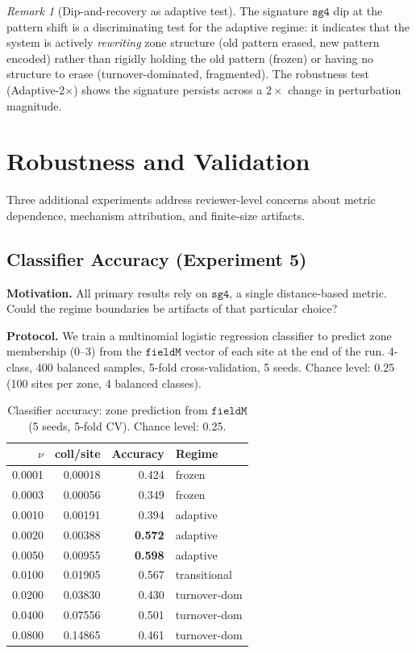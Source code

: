 \documentclass[11pt]{article}
\theoremstyle{remark}
\newtheorem{remark}[theorem]{Remark}
\begin{document}
\begin{remark}[Dip-and-recovery as adaptive test]
The signature $\mathtt{sg4}$ dip at the pattern shift is a discriminating test
for the adaptive regime: it indicates that the system is actively \emph{rewriting}
zone structure (old pattern erased, new pattern encoded) rather than rigidly
holding the old pattern (frozen) or having no structure to erase (turnover-dominated, fragmented).
The robustness test (Adaptive-2$\times$) shows the signature persists across a
$2\times$ change in perturbation magnitude.
\end{remark}

\section{Robustness and Validation}

Three additional experiments address reviewer-level concerns about metric
dependence, mechanism attribution, and finite-size artifacts.

\subsection{Classifier Accuracy (Experiment 5)}

\textbf{Motivation.} All primary results rely on $\mathtt{sg4}$, a single
distance-based metric. Could the regime boundaries be artifacts of that
particular choice?

\textbf{Protocol.} We train a multinomial logistic regression classifier to
predict zone membership (0--3) from the $\mathtt{fieldM}$ vector of each site
at the end of the run. 4-class, 400 balanced samples, 5-fold cross-validation,
5 seeds. Chance level: 0.25 (100 sites per zone, 4 balanced classes).

\begin{table}[h]
\centering
\caption{Classifier accuracy: zone prediction from $\mathtt{fieldM}$ (5 seeds,
5-fold CV). Chance level: 0.25.}
\label{tab:exp5}
\begin{tabular}{rrrl}
\toprule
$\nu$ & coll/site & Accuracy & Regime \\
\midrule
0.0001 & 0.00018 & 0.424 & frozen \\
0.0003 & 0.00056 & 0.349 & frozen \\
0.0010 & 0.00191 & 0.394 & adaptive \\
0.0020 & 0.00388 & \textbf{0.572} & adaptive \\
0.0050 & 0.00955 & \textbf{0.598} & adaptive \\
0.0100 & 0.01905 & 0.567 & transitional \\
0.0200 & 0.03830 & 0.430 & turnover-dom \\
0.0400 & 0.07556 & 0.501 & turnover-dom \\
0.0800 & 0.14865 & 0.461 & turnover-dom \\
\bottomrule
\end{tabular}
\end{table}
\end{document}
